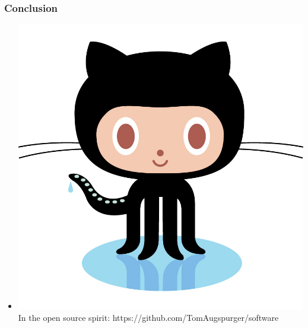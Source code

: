 \documentclass{beamer}
\begin{document}
\begin{frame}[t]\frametitle{Conclusion}
  \begin{itemize}

    \item \includegraphics[scale=.025]{octocat.jpg} In the open source spirit: https://github.com/TomAugspurger/software

  \end{itemize}    
\end{frame}
\end{document}
